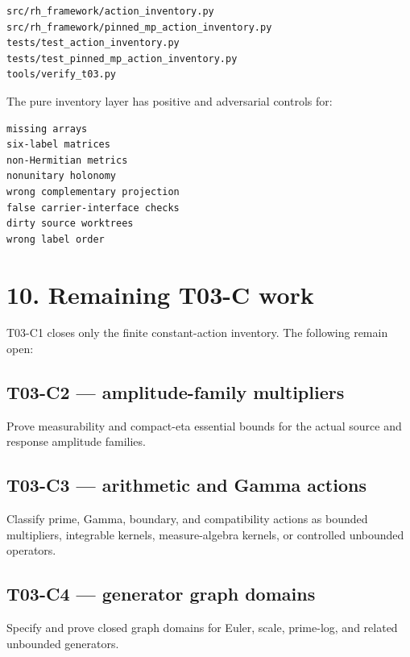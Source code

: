 \begin{verbatim}
src/rh_framework/action_inventory.py
src/rh_framework/pinned_mp_action_inventory.py
tests/test_action_inventory.py
tests/test_pinned_mp_action_inventory.py
tools/verify_t03.py
\end{verbatim}

The pure inventory layer has positive and adversarial controls for:

\begin{verbatim}
missing arrays
six-label matrices
non-Hermitian metrics
nonunitary holonomy
wrong complementary projection
false carrier-interface checks
dirty source worktrees
wrong label order
\end{verbatim}

\hypertarget{remaining-t03-c-work}{%
\section{10. Remaining T03-C work}\label{remaining-t03-c-work}}

T03-C1 closes only the finite constant-action inventory. The following remain
open:

\hypertarget{t03-c2-amplitude-family-multipliers}{%
\subsection{T03-C2 --- amplitude-family multipliers}\label{t03-c2-amplitude-family-multipliers}}

Prove measurability and compact-eta essential bounds for the actual source and
response amplitude families.

\hypertarget{t03-c3-arithmetic-and-gamma-actions}{%
\subsection{T03-C3 --- arithmetic and Gamma actions}\label{t03-c3-arithmetic-and-gamma-actions}}

Classify prime, Gamma, boundary, and compatibility actions as bounded
multipliers, integrable kernels, measure-algebra kernels, or controlled
unbounded operators.

\hypertarget{t03-c4-generator-graph-domains}{%
\subsection{T03-C4 --- generator graph domains}\label{t03-c4-generator-graph-domains}}

Specify and prove closed graph domains for Euler, scale, prime-log, and related
unbounded generators.

